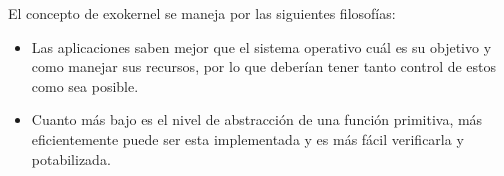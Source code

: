 \documentclass[10pt, a4paper]{article}
\begin{document}
El concepto de exokernel se maneja por las siguientes filosofías:

\begin{itemize}
 \item Las aplicaciones saben mejor que el sistema operativo cuál es su objetivo y como manejar sus recursos, por lo que deberían tener tanto control de estos como sea posible. 
 \item Cuanto más bajo es el nivel de abstracción de una función primitiva, más eficientemente puede ser esta implementada y es más fácil verificarla y potabilizada. 
\end{itemize}
\end{document}
